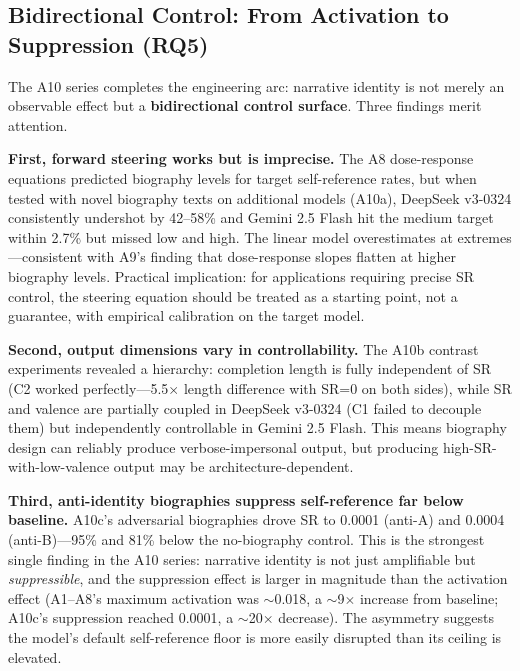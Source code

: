 \documentclass[11pt,a4paper]{article}
\begin{document}
\subsection{Bidirectional Control: From Activation to Suppression (RQ5)}

The A10 series completes the engineering arc: narrative identity is not merely an observable effect but a \textbf{bidirectional control surface}. Three findings merit attention.

\textbf{First, forward steering works but is imprecise.} The A8 dose-response equations predicted biography levels for target self-reference rates, but when tested with novel biography texts on additional models (A10a), DeepSeek v3-0324 consistently undershot by 42--58\% and Gemini 2.5 Flash hit the medium target within 2.7\% but missed low and high. The linear model overestimates at extremes---consistent with A9's finding that dose-response slopes flatten at higher biography levels. Practical implication: for applications requiring precise SR control, the steering equation should be treated as a starting point, not a guarantee, with empirical calibration on the target model.

\textbf{Second, output dimensions vary in controllability.} The A10b contrast experiments revealed a hierarchy: completion length is fully independent of SR (C2 worked perfectly---5.5$\times$ length difference with SR=0 on both sides), while SR and valence are partially coupled in DeepSeek v3-0324 (C1 failed to decouple them) but independently controllable in Gemini 2.5 Flash. This means biography design can reliably produce verbose-impersonal output, but producing high-SR-with-low-valence output may be architecture-dependent.

\textbf{Third, anti-identity biographies suppress self-reference far below baseline.} A10c's adversarial biographies drove SR to 0.0001 (anti-A) and 0.0004 (anti-B)---95\% and 81\% below the no-biography control. This is the strongest single finding in the A10 series: narrative identity is not just amplifiable but \textit{suppressible}, and the suppression effect is larger in magnitude than the activation effect (A1--A8's maximum activation was $\sim$0.018, a $\sim$9$\times$ increase from baseline; A10c's suppression reached 0.0001, a $\sim$20$\times$ decrease). The asymmetry suggests the model's default self-reference floor is more easily disrupted than its ceiling is elevated.
\end{document}
